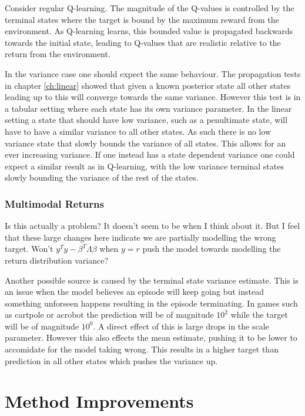 Consider regular Q-learning. The magnitude of the Q-values is controlled by the terminal states where the target is bound by the maximum reward from the environment. As Q-learning learns, this bounded value is propagated backwards towards the initial state, leading to Q-values that are realistic relative to the return from the environment.

In the variance case one should expect the same behaviour. The propagation tests in chapter \ref{ch:linear} showed that given a known posterior state all other states leading up to this will converge towards the same variance. However this test is in a tabular setting where each state has its own variance parameter. In the linear setting a state that should have low variance, such as a penultimate state, will have to have a similar variance to all other states. As such there is no low variance state that slowly bounds the variance of all states. This allows for an ever increasing variance. If one instead has a state dependent variance one could expect a similar result as in Q-learning, with the low variance terminal states slowly bounding the variance of the rest of the states.

\subsubsection{Multimodal Returns}

\todo Is this actually a problem? It doesn't seem to be when I think about it. But I feel that these large changes here indicate we are partially modelling the wrong target. Won't $y^Ty - \beta^T\Lambda\beta$ when $y = r$ push the model towards modelling the return distribution variance? 
 
Another possible source is caused by the terminal state variance estimate. This is an issue when the model believes an episode will keep going but instead something unforseen happens resulting in the episode terminating. In games such as cartpole or acrobot the prediction will be of magnitude $10^2$ while the target will be of magnitude $10^0$. A direct effect of this is large drops in the scale parameter. However this also effects the mean estimate, pushing it to be lower to accomidate for the model taking wrong. This results in a higher target than prediction in all other states which pushes the variance up.

\section{Method Improvements}

